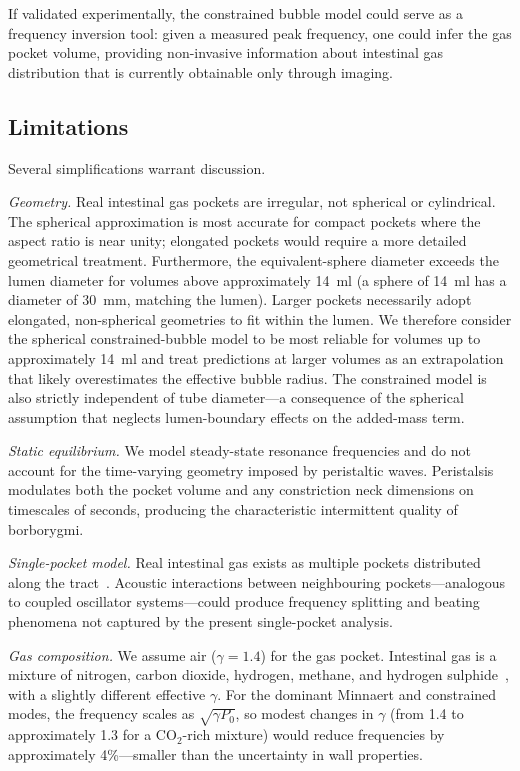 \documentclass[review]{elsarticle}
\begin{document}
If validated experimentally, the constrained bubble model could serve as a
frequency inversion tool: given a measured peak frequency, one could infer
the gas pocket volume, providing non-invasive information about intestinal
gas distribution that is currently obtainable only through imaging.

\subsection{Limitations}
\label{sec:limitations}

Several simplifications warrant discussion.

\emph{Geometry.}  Real intestinal gas pockets are irregular, not spherical
or cylindrical.  The spherical approximation is most accurate for compact
pockets where the aspect ratio is near unity; elongated pockets would
require a more detailed geometrical treatment.  Furthermore, the
equivalent-sphere diameter exceeds the lumen diameter for volumes above
approximately \SI{14}{\milli\litre} (a sphere of \SI{14}{\milli\litre}
has a diameter of \SI{30}{\milli\metre}, matching the lumen).  Larger
pockets necessarily adopt elongated, non-spherical geometries to fit
within the lumen.  We therefore consider the spherical constrained-bubble
model to be most reliable for volumes up to approximately
\SI{14}{\milli\litre} and treat predictions at larger volumes as an
extrapolation that likely overestimates the effective bubble radius.
The constrained model is also strictly independent of tube diameter---a
consequence of the spherical assumption that neglects lumen-boundary
effects on the added-mass term.

\emph{Static equilibrium.}  We model steady-state resonance frequencies and
do not account for the time-varying geometry imposed by peristaltic waves.
Peristalsis modulates both the pocket volume and any constriction neck
dimensions on timescales of seconds, producing the characteristic intermittent
quality of borborygmi.

\emph{Single-pocket model.}  Real intestinal gas exists as multiple pockets
distributed along the tract~\cite{Serra2001, Levitt1971}.  Acoustic
interactions between neighbouring pockets---analogous to coupled oscillator
systems---could produce frequency splitting and beating phenomena not captured
by the present single-pocket analysis.

\emph{Gas composition.}  We assume air ($\gamma = 1.4$) for the gas pocket.
Intestinal gas is a mixture of nitrogen, carbon dioxide, hydrogen, methane,
and hydrogen sulphide~\cite{Suarez1997, Levitt1971}, with a slightly different
effective $\gamma$.  For the dominant Minnaert and constrained modes, the
frequency scales as $\sqrt{\gamma P_0}$, so modest changes in $\gamma$ (from
1.4 to approximately 1.3 for a CO$_2$-rich mixture) would reduce frequencies
by approximately 4\%---smaller than the uncertainty in wall properties.
\end{document}
